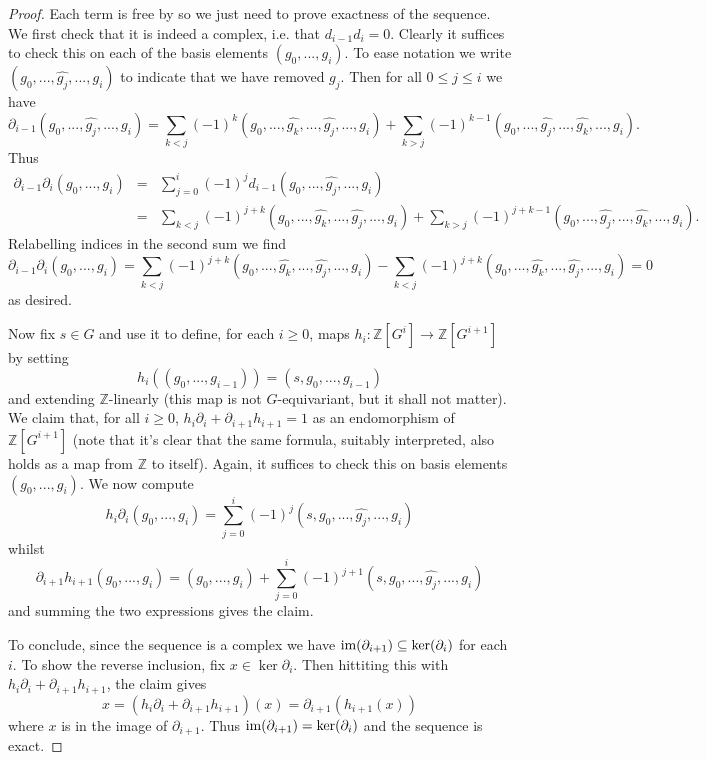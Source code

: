 \documentclass[11pt]{amsart}
\numberwithin{equation}{section}
\theoremstyle{remark}
\theoremstyle{remark}
\theoremstyle{remark}
\theoremstyle{definition}
\theoremstyle{definition}
\theoremstyle{definition}
\theoremstyle{definition}
\theoremstyle{definition}
\theoremstyle{definition}
\begin{document}
\begin{proof}
Each term is free by  so we just need to prove exactness of the sequence. We first check that it is indeed a complex, i.e. that $d_{i-1}d_{i}=0$. Clearly it suffices to check this on each of the basis elements $(g_0,...,g_i)$. To ease notation we write $(g_0,...,\hat{g_j},...,g_i)$ to indicate that we have removed $g_j$. Then for all $0\leq j\leq i$ we have
\[\partial_{i-1}(g_0,...,\hat{g_j},...,g_i)=\sum_{k<j}(-1)^k(g_0,...,\hat{g_k},...,\hat{g_j},...,g_i)+\sum_{k>j}(-1)^{k-1}(g_0,...,\hat{g_j},...,\hat{g_k},...,g_i).\]
Thus 
\begin{eqnarray*}
\partial_{i-1}\partial_{i}(g_0,...,g_i)&=&\sum_{j=0}^i (-1)^jd_{i-1}(g_0,...,\hat{g_j},...,g_i)\\
&=&\sum_{k<j}(-1)^{j+k}(g_0,...,\hat{g_k},...,\hat{g_j},...,g_i)+\sum_{k>j}(-1)^{j+k-1}(g_0,...,\hat{g_j},...,\hat{g_k},...,g_i).
\end{eqnarray*}
Relabelling indices in the second sum we find
\[\partial_{i-1}\partial_{i}(g_0,...,g_i)=\sum_{k<j}(-1)^{j+k}(g_0,...,\hat{g_k},...,\hat{g_j},...,g_i)-\sum_{k<j}(-1)^{j+k}(g_0,...,\hat{g_k},...,\hat{g_j},...,g_i)=0\]
as desired.

Now fix $s\in G$ and use it to define, for each $i\geq 0$,  maps $h_i:\mathbb{Z}[G^{i}]\rightarrow \mathbb{Z}[G^{i+1}]$ by setting
\[h_i\left((g_0,...,g_{i-1})\right)=(s,g_0,...,g_{i-1})\]
and extending $\mathbb{Z}$-linearly (this map is not $G$-equivariant, but it shall not matter). We claim that, for all $i\geq 0$, $h_i\partial_i+\partial_{i+1}h_{i+1}=1$ as an endomorphism of $\mathbb{Z}[G^{i+1}]$ (note that it's clear that the same formula, suitably interpreted, also holds as a map from $\mathbb{Z}$ to itself). Again, it suffices to check this on basis elements $(g_0,...,g_i)$. We now compute
\[h_i\partial_i(g_0,...,g_i)=\sum_{j=0}^i(-1)^j(s,g_0,...,\hat{g_j},...,g_i)\]
whilst
\[\partial_{i+1}h_{i+1}(g_0,...,g_i)=(g_0,...,g_i)+\sum_{j=0}^i(-1)^{j+1}(s,g_0,...,\hat{g_j},...,g_i)\]
and summing the two expressions gives the claim. 

To conclude, since the sequence is a complex we have $\textup{im}(\partial_{i+1})\subseteq \ker(\partial_i)$ for each $i$. To show the reverse inclusion, fix $x\in \ker{\partial_i}$. Then hittiting this with $h_i\partial_i+\partial_{i+1}h_{i+1}$, the claim gives
\[x=(h_i\partial_i+\partial_{i+1}h_{i+1})(x)=\partial_{i+1}(h_{i+1}(x))\]
where $x$ is in the image of $\partial_{i+1}$. Thus  $\textup{im}(\partial_{i+1})=\ker(\partial_i)$ and the sequence is exact.  
\end{proof}
\end{document}
